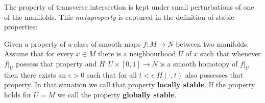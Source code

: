 \begin{remark}
The property of transverse intersection is kept under small perturbations of one of the manifolds. This \textit{metaproperty} is captured in the definition of stable properties:
\end{remark}
\begin{definition}
Given a property of a class of smooth maps ${f:M \to N}$ between two manifolds. Assume that for every $x\in M$ there is a neighbourhood $U$ of $x$ such that whenever  $f|_U$ possess that property and $H:U\times [0,1] \to N$ is a smooth homotopy of $f|_U$ then there exists an $\epsilon>0$ such that for all $t<\epsilon$ $H(\cdot,t)$ also possesses that property. In that situation we call that property \textbf{locally stable}.  If the property holds for $U=M$ we call the property \textbf{globally stable}.\end{definition}

